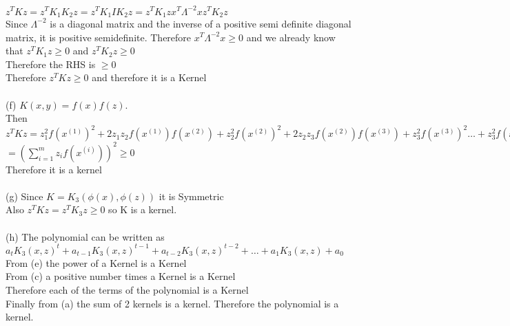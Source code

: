 \begin{answer}
$z^TKz=z^TK_1K_2z=z^TK_1IK_2z=z^TK_1 z x^T \Lambda^{-2} x z^TK_2z$\\
Since $\Lambda^{-2}$ is a diagonal matrix and the inverse of a positive semi definite diagonal matrix, it is positive semidefinite. Therefore $x^T \Lambda^{-2} x \geq 0$ and we already know that $z^TK_1 z \geq 0$ and $z^TK_2 z \geq 0$\\
Therefore the RHS is $\geq 0$\\
Therefore $z^TKz \geq 0$ and therefore it is a Kernel\\\\
(f) $K(x,y)=f(x)f(z)$.\\
Then $z^TKz=z_1^2f(x^{(1)})^2+2z_1z_2f(x^{(1)})f(x^{(2)})+z_2^2f(x^{(2)})^2+2z_2z_3f(x^{(2)})f(x^{(3)})+z_3^2f(x^{(3)})^2 \dots +z_3^2f(x^{(3)})^2$\\
$=(\sum_{i=1}^{m}z_i f(x^{(i)}))^2 \geq 0$\\
Therefore it is a kernel\\\\
(g) Since $K=K_3(\phi(x),\phi(z))$ it is Symmetric\\
Also $z^TKz=z^TK_3z \geq 0$ so K is a kernel.\\\\
(h) The polynomial can be written as $a_tK_3(x,z)^t+a_{t-1}K_3(x,z)^{t-1}+a_{t-2}K_3(x,z)^{t-2}+\dots+a_1K_3(x,z)+a_0$\\
From (e) the power of a Kernel is a Kernel\\
From (c) a positive number times a Kernel is a Kernel\\
Therefore each of the terms of the polynomial is a Kernel\\
Finally from (a) the sum of 2 kernels is a kernel. Therefore the polynomial is a kernel.
\end{answer}